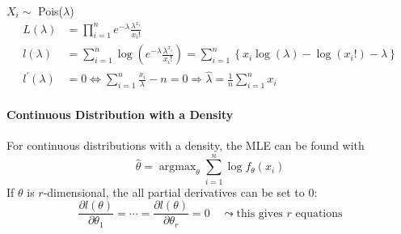 \begin{examplesection}
    $X_i \sim$ Pois($\lambda$)
    \noindent\begin{align*}
        L(\lambda)          & =\prod_{i=1}^n e^{-\lambda}\frac{\lambda^{x_i}}{x_i!}                                                                               \\
        l(\lambda)          & =\sum_{i=1}^n\log\left(e^{-\lambda}\frac{\lambda^{x_i}}{x_i!}\right)=\sum_{i=1}^n\left\{x_i\log(\lambda)-\log(x_i!)-\lambda\right\} \\
        l^{\prime}(\lambda) & = 0 \Leftrightarrow \sum_{i=1}^n\frac{x_i}\lambda-n = 0 \Rightarrow \hat{\lambda} =\frac1n\sum_{i=1}^n x_i
    \end{align*}
\end{examplesection}

\paragraph{Continuous Distribution with a Density}
For continuous distributions with a density, the MLE can be found with
\noindent\begin{equation*}
    \hat{\theta}=\operatorname{argmax}_\theta\sum_{i=1}^n\log f_\theta(x_i)
\end{equation*}
If $\theta$ is $r$-dimensional, the all partial derivatives can be set to 0:
\noindent\begin{equation*}
    \frac{\partial l(\theta)}{\partial\theta_1}=\cdots=\frac{\partial l(\theta)}{\partial\theta_r}=0\quad\leadsto\text{this gives }r\text{ equations}
\end{equation*}

